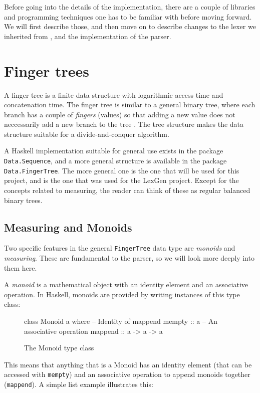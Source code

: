 \documentclass[a4paper,12pt,twosided]{report}
\renewcommand\cite{\citep}
\begin{document}
Before going into the details of the implementation, there are a
couple of libraries and programming techniques one has to be familiar with
before moving forward. We will first describe those, and then move on to
describe changes to the lexer we inherited from \citet{divconqlex}, and the
implementation of the parser.

\section{Finger trees}
A finger tree is a finite data structure with logarithmic access time and
concatenation time. The finger tree is similar to a general binary tree, where each
branch has a couple of \textit{fingers} (values) so that adding a new value does
not neccessarily add a new branch to the tree \cite{fingertrees}. The tree
structure makes the data structure suitable for a divide-and-conquer algorithm.

A Haskell implementation suitable for general use exists in the package
\texttt{Data.Sequence}, and a more general structure is available in the
package \texttt{Data.FingerTree}. The more general one is the one that will be
used for this project, and is the one that was used for the LexGen project.
Except for the concepts related to measuring, the reader can think of these as
regular balanced binary trees. 

\subsection{Measuring and Monoids}
Two specific features in the general \texttt{FingerTree} data type are
\textit{monoids} and \textit{measuring}. These are fundamental to the parser, so
we will look more deeply into them here.

A \textit{monoid} is a mathematical object with an identity element and an
associative operation. In Haskell, monoids are provided by writing instances of
this type class:
\begin{figure}[H]
\begin{code}
class Monoid a where
    -- Identity of mappend
    mempty  :: a
    -- An associative operation
    mappend :: a -> a -> a
\end{code}
\caption{The Monoid type class}
\end{figure}

This means that anything that is a Monoid has an identity element (that can be
accessed with \texttt{mempty}) and an associative operation to append monoids
together (\texttt{mappend}). A simple list example illustrates this:
\end{document}
